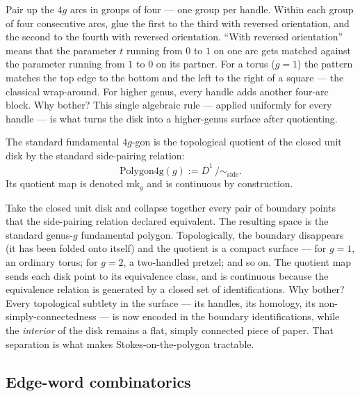 \begin{layman}
Pair up the \(4g\) arcs in groups of four — one group per handle.
Within each group of four consecutive arcs, glue the first to the
third with reversed orientation, and the second to the fourth with
reversed orientation. ``With reversed orientation'' means that the
parameter \(t\) running from \(0\) to \(1\) on one arc gets matched
against the parameter running from \(1\) to \(0\) on its partner.
For a torus (\(g=1\)) the pattern matches the top edge to the bottom
and the left to the right of a square — the classical wrap-around.
For higher genus, every handle adds another four-arc block. Why
bother? This single algebraic rule — applied uniformly for every
handle — is what turns the disk into a higher-genus surface after
quotienting.
\end{layman}

\begin{definition}
\label{def:polygon4g}
The standard fundamental \(4g\)-gon is the topological quotient of
the closed unit disk by the standard side-pairing relation:
\[
  \mathrm{Polygon4g}(g) := \overline{D}^{1}\,/\!\sim_{\mathrm{side}}.
\]
Its quotient map is denoted \(\mathrm{mk}_g\) and is continuous by
construction.
\leanok
\end{definition}

\begin{layman}
Take the closed unit disk and collapse together every pair of
boundary points that the side-pairing relation declared equivalent.
The resulting space is the standard genus-\(g\) fundamental polygon.
Topologically, the boundary disappears (it has been folded onto
itself) and the quotient is a compact surface — for \(g=1\), an
ordinary torus; for \(g=2\), a two-handled pretzel; and so on. The
quotient map sends each disk point to its equivalence class, and is
continuous because the equivalence relation is generated by a closed
set of identifications. Why bother? Every topological subtlety in
the surface — its handles, its homology, its non-simply-connectedness
— is now encoded in the boundary identifications, while the
\emph{interior} of the disk remains a flat, simply connected piece
of paper. That separation is what makes Stokes-on-the-polygon
tractable.
\end{layman}

\subsection{Edge-word combinatorics}

